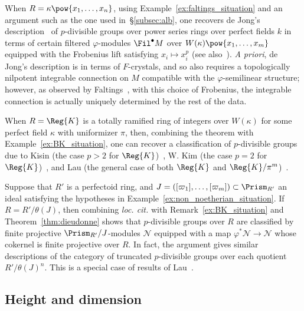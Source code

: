 \documentclass[10pt]{amsart}
\begin{document}
\begin{remark}
\label{rem:power_series_BT}
When $R = \kappa\pow{x_1,\ldots,x_n}$, using Example~\ref{ex:faltings_situation} and an argument such as the one used in~\S\ref{subsec:alb}, one recovers de Jong's description~\cite{dejong:formal_rigid} of $p$-divisible groups over power series rings over perfect fields $k$ in terms of certain filtered $\varphi$-modules $\Fil^\bullet M$ over $W(\kappa)\pow{x_1,\ldots,x_m}$ equipped with the Frobenius lift satisfying $x_i\mapsto x_i^p$ (see also~\cite[\S 7]{faltings:very_ramified}). \emph{A priori}, de Jong's description is in terms of $F$-crystals, and so also requires a topologically nilpotent integrable connection on $M$ compatible with the $\varphi$-semilinear structure; however, as observed by Faltings~\cite[Theorem 10]{faltings:very_ramified}, with this choice of Frobenius, the integrable connection is actually uniquely determined by the rest of the data.
\end{remark}

\begin{remark}
 When $R = \Reg{K}$ is a totally ramified ring of integers over $W(\kappa)$ for some perfect field $\kappa$ with uniformizer $\pi$, then, combining the theorem with Example~\ref{ex:BK_situation}, one can recover a classification of $p$-divisible groups due to Kisin (the case $p>2$ for $\Reg{K}$)~\cite{kisin:f_crystals}, W. Kim (the case $p=2$ for $\Reg{K}$)~\cite{kim:2-adic}, and Lau (the general case of both $\Reg{K}$ and $\Reg{K}/\pi^m$)~\cite{lau:displays}.
\end{remark}


\begin{remark}
\label{rem:non_noetherian_pdiv}
Suppose that $R'$ is a perfectoid ring, and $J = ([\varpi_1],\ldots,[\varpi_m])\subset \Prism_{R'}$ an ideal satisfying the hypotheses in Example~\ref{ex:non_noetherian_situation}. If $R = R'/\theta(J)$, then combining \emph{loc. cit.} with Remark~\ref{ex:BK_situation} and Theorem~\ref{thm:dieudonne} shows that $p$-divisible groups over $R$ are classified by finite projective $\Prism_{R'}/J$-modules $\mathcal{N}$ equipped with a map $\varphi^* \mathcal{N}\to \mathcal{N}$ whose cokernel is finite projective over $R$. In fact, the argument gives similar descriptions of the category of truncated $p$-divisible groups over each quotient $R'/\theta(J)^n$. This is a special case of results of Lau~\cite[\S 5]{MR3867290}.
\end{remark}

\subsection{Height and dimension}
\end{document}
